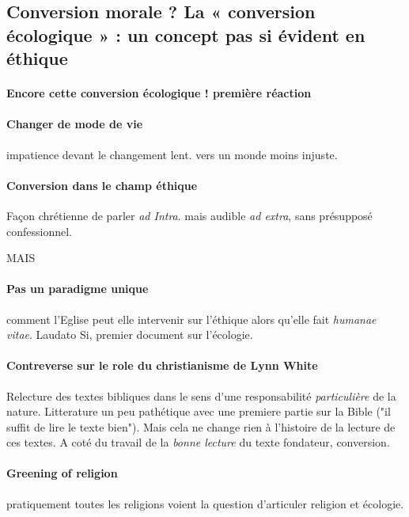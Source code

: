 \subsection{Conversion morale ?
La « conversion écologique » : un concept pas si évident en éthique}

\paragraph{Encore cette conversion écologique ! première réaction}

\paragraph{Changer de mode de vie} impatience devant le changement lent. vers un monde moins injuste.

\paragraph{Conversion dans le champ éthique} Façon chrétienne de parler \textit{ad Intra}. mais audible \textit{ad extra}, sans présupposé confessionnel. 

MAIS
\paragraph{Pas un paradigme unique} comment l'Eglise peut elle intervenir sur l'éthique alors qu'elle fait \textit{humanae vitae}. Laudato Si, premier document sur l'écologie.

\paragraph{Contreverse sur le role du christianisme de Lynn White} Relecture des textes bibliques dans le sens d'une responsabilité \textit{particulière} de la nature. Litterature un peu pathétique avec une premiere partie sur la Bible ("il suffit de lire le texte bien"). Mais cela ne change rien à l'histoire de la lecture de ces textes. A coté du travail de la \textit{bonne lecture} du texte fondateur, conversion.

\paragraph{Greening of religion} pratiquement toutes les religions voient la question d'articuler religion et écologie.

